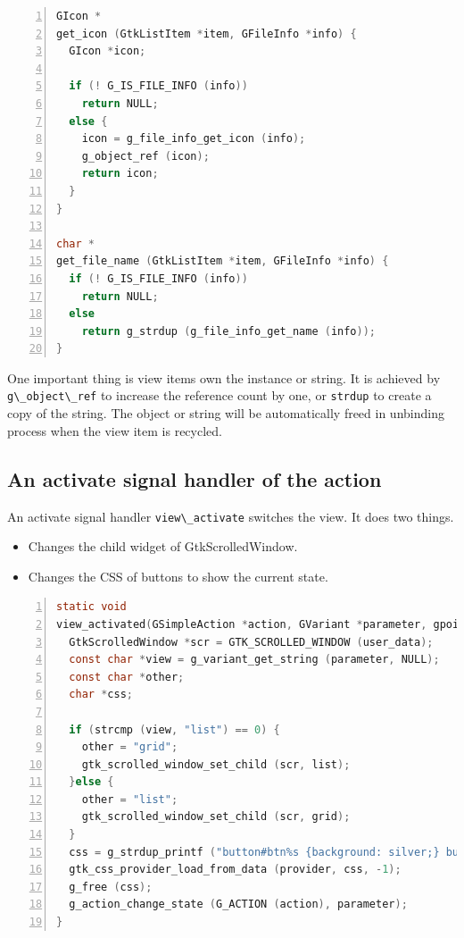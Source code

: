 \begin{lstlisting}[language=C, numbers=left]
GIcon *
get_icon (GtkListItem *item, GFileInfo *info) {
  GIcon *icon;

  if (! G_IS_FILE_INFO (info))
    return NULL;
  else {
    icon = g_file_info_get_icon (info);
    g_object_ref (icon);
    return icon;
  }
}

char *
get_file_name (GtkListItem *item, GFileInfo *info) {
  if (! G_IS_FILE_INFO (info))
    return NULL;
  else
    return g_strdup (g_file_info_get_name (info));
}
\end{lstlisting}

One important thing is view items own the instance or string. It is
achieved by \passthrough{\lstinline!g\_object\_ref!} to increase the
reference count by one, or \passthrough{\lstinline!strdup!} to create a
copy of the string. The object or string will be automatically freed in
unbinding process when the view item is recycled.

\hypertarget{an-activate-signal-handler-of-the-action}{%
\subsection{An activate signal handler of the
action}\label{an-activate-signal-handler-of-the-action}}

An activate signal handler \passthrough{\lstinline!view\_activate!}
switches the view. It does two things.

\begin{itemize}
\tightlist
\item
  Changes the child widget of GtkScrolledWindow.
\item
  Changes the CSS of buttons to show the current state.
\end{itemize}

\begin{lstlisting}[language=C, numbers=left]
static void
view_activated(GSimpleAction *action, GVariant *parameter, gpointer user_data) {
  GtkScrolledWindow *scr = GTK_SCROLLED_WINDOW (user_data);
  const char *view = g_variant_get_string (parameter, NULL);
  const char *other;
  char *css;

  if (strcmp (view, "list") == 0) {
    other = "grid";
    gtk_scrolled_window_set_child (scr, list);
  }else {
    other = "list";
    gtk_scrolled_window_set_child (scr, grid);
  }
  css = g_strdup_printf ("button#btn%s {background: silver;} button#btn%s {background: white;}", view, other);
  gtk_css_provider_load_from_data (provider, css, -1);
  g_free (css);
  g_action_change_state (G_ACTION (action), parameter);
}
\end{lstlisting}

